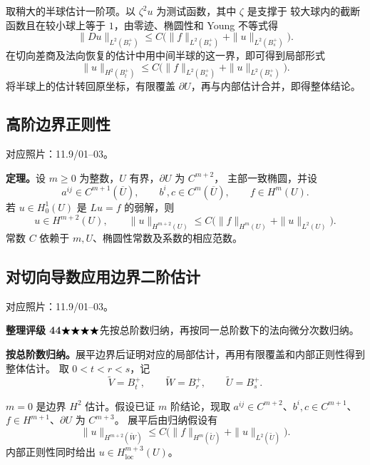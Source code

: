 \documentclass[UTF8,a4paper,11pt,fontset=fandol]{ctexart}
\newcommand{\Ub}{\overline U}
\newcommand{\source}[1]{{\small\color{notegray}对应照片：#1。}\par}
\newcommand{\proofstars}[1]{\ensuremath{%
\ifnum#1>0\relax\bigstar\fi
\ifnum#1>1\relax\bigstar\fi
\ifnum#1>2\relax\bigstar\fi
\ifnum#1>3\relax\bigstar\fi
\ifnum#1>4\relax\bigstar\fi}}
\newcommand{\proofrating}[3]{\par{\small\color{proofblue}%
\textbf{整理评级 #1}\enspace\proofstars{#2}\quad #3\par}}
\begin{document}
取稍大的半球估计一阶项。以 $\zeta^2u$ 为测试函数，其中 $\zeta$ 是支撑于
较大球内的截断函数且在较小球上等于 $1$，由零迹、椭圆性和 Young 不等式得
\[
\|Du\|_{L^2(B_r^+)}
\le C\bigl(\|f\|_{L^2(B_s^+)}+\|u\|_{L^2(B_s^+)}\bigr).
\]
在切向差商及法向恢复的估计中用中间半球的这一界，即可得到局部形式
\[
\boxed{\|u\|_{H^2(B_t^+)}
\le C\bigl(\|f\|_{L^2(B_s^+)}+\|u\|_{L^2(B_s^+)}\bigr).}
\]
将半球上的估计转回原坐标，有限覆盖 $\partial U$，再与内部估计合并，即得整体结论。

\subsection{高阶边界正则性}
\source{11.9/01--03}
\textbf{定理。}设 $m\ge0$ 为整数，$U$ 有界，$\partial U$ 为 $C^{m+2}$，
主部一致椭圆，并设
\[
a^{ij}\in C^{m+1}(\Ub),\qquad
b^i,c\in C^m(\Ub),\qquad f\in H^m(U).
\]
若 $u\in H_0^1(U)$ 是 $Lu=f$ 的弱解，则
\[
\boxed{u\in H^{m+2}(U),\qquad
\|u\|_{H^{m+2}(U)}
\le C\bigl(\|f\|_{H^m(U)}+\|u\|_{L^2(U)}\bigr).}
\]
常数 $C$ 依赖于 $m,U$、椭圆性常数及系数的相应范数。

\newpage
\subsection{对切向导数应用边界二阶估计}
\source{11.9/01--03}
\proofrating{44}{4}{先按总阶数归纳，再按同一总阶数下的法向微分次数归纳。}
\textbf{按总阶数归纳。}展平边界后证明对应的局部估计，再用有限覆盖和内部正则性得到整体估计。
取 $0<t<r<s$，记
\[
\widetilde V=B_t^+,\qquad
\widetilde W=B_r^+,\qquad
\widetilde U=B_s^+.
\]
\begin{center}
\end{center}
$m=0$ 是边界 $H^2$ 估计。假设已证 $m$ 阶结论，现取
$a^{ij}\in C^{m+2}$、$b^i,c\in C^{m+1}$、$f\in H^{m+1}$、$\partial U$ 为 $C^{m+3}$。
展平后由归纳假设有
\[
\|u\|_{H^{m+2}(\widetilde W)}
\le C\bigl(\|f\|_{H^m(\widetilde U)}+\|u\|_{L^2(\widetilde U)}\bigr).
\]
内部正则性同时给出 $u\in H_{\mathrm{loc}}^{m+3}(U)$。
\end{document}
